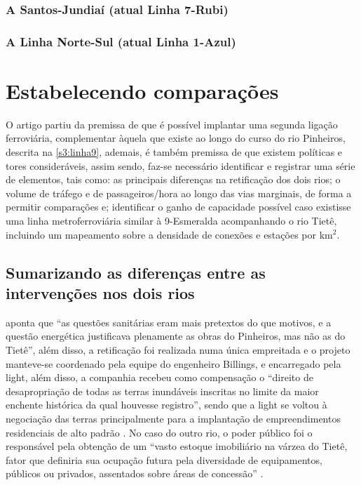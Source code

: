 \documentclass[
article,			%
11pt,				%
oneside,			%
a4paper,			%
english,			%
brazil,				%
sumario=tradicional
]{abntex2}
\begin{document}
	\subsubsection{A Santos-Jundiaí (atual Linha 7-Rubi)} \label{s3:efsj}
	
	\subsubsection{A Linha Norte-Sul (atual Linha 1-Azul)} \label{s3:nortesul}
	
	
	\section{Estabelecendo comparações} \label{s1:comparando}
	
	O artigo partiu da premissa de que é possível implantar uma segunda ligação ferroviária, complementar àquela que existe ao longo do curso do rio Pinheiros, descrita na \autoref{s3:linha9}, ademais, é também premissa de que existem políticas e tores consideráveis, assim sendo, faz-se necessário identificar e registrar uma série de elementos, tais como: as principais diferenças na retificação dos dois rios; o volume de tráfego e de passageiros/hora ao longo das vias marginais, de forma a permitir comparações e; identificar o ganho de capacidade possível caso existisse uma linha metroferroviária similar à 9-Esmeralda acompanhando o rio Tietê, incluindo um mapeamento sobre a densidade de conexões e estações por km$^{2}$.
	
	\subsection{Sumarizando as diferenças entre as intervenções nos dois rios} \label{s2:sumarizando}
	
	 aponta que ``as questões sanitárias eram mais pretextos do que motivos, e a questão energética justificava plenamente as obras do Pinheiros, mas não as do Tietê'', além disso, a retificação foi realizada numa única empreitada e o projeto manteve-se coordenado pela equipe do engenheiro Billings, \cite[p. 58]{franco2005a} e encarregado pela \glsdesc{light}, além disso, a companhia recebeu como compensação o ``direito de desapropriação de todas as terras inundáveis inscritas no limite da maior enchente histórica da qual houvesse registro''\cite[p. 59]{franco2005a}, sendo que a \gls{light} se voltou à negociação das terras principalmente para a implantação de empreendimentos residenciais de alto padrão \cite[p. 55]{franco2005a}. No caso do outro rio, o poder público foi o responsável pela obtenção de um ``vasto estoque imobiliário na várzea do Tietê, fator que definiria sua ocupação futura pela diversidade de equipamentos, públicos ou privados, assentados sobre áreas de concessão'' \cite[p. 55]{franco2005a}.
	
\end{document}
